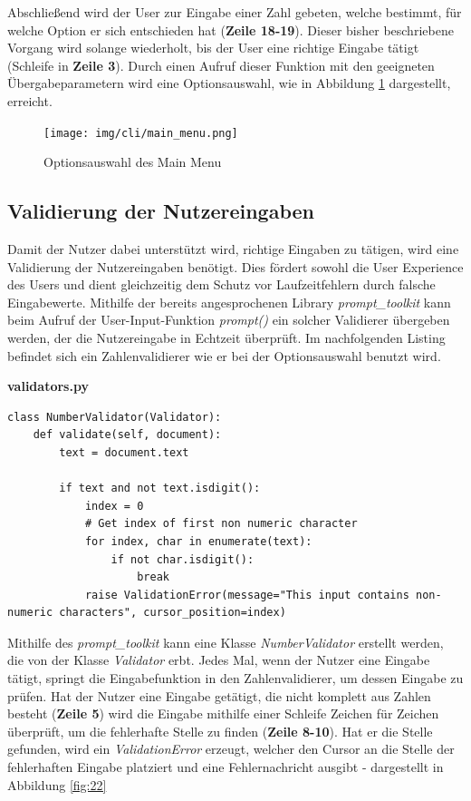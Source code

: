 \documentclass[oneside]{ausarbeitung}
\begin{document}
Abschließend wird der User zur Eingabe einer Zahl gebeten, welche bestimmt, für welche Option er sich entschieden hat (\textbf{Zeile 18-19}). Dieser bisher beschriebene Vorgang wird solange wiederholt, bis der User eine richtige Eingabe tätigt (Schleife in \textbf{Zeile 3}). Durch einen Aufruf dieser Funktion mit den geeigneten Übergabeparametern wird eine Optionsauswahl, wie in Abbildung \ref{fig:21} dargestellt, erreicht. 

\begin{figure}[H]
  \centering
  \texttt{[image: img/cli/main\_menu.png]}
  \caption{Optionsauswahl des Main Menu}
  \label{fig:21}
\end{figure}

\subsection{Validierung der Nutzereingaben}
\label{sub:validierung_der_nutzereingaben}

Damit der Nutzer dabei unterstützt wird, richtige Eingaben zu tätigen, wird eine Validierung der Nutzereingaben benötigt. Dies fördert sowohl die User Experience des Users und dient gleichzeitig dem Schutz vor Laufzeitfehlern durch falsche Eingabewerte. Mithilfe der bereits angesprochenen Library \textit{prompt\_toolkit} kann beim Aufruf der User-Input-Funktion \textit{prompt()} ein solcher Validierer übergeben werden, der die Nutzereingabe in Echtzeit überprüft. Im nachfolgenden Listing befindet sich ein Zahlenvalidierer wie er bei der Optionsauswahl benutzt wird.

\lstset{language=Python}
\lstset{frame=lines}
\lstset{basicstyle=\footnotesize}
\textbf{validators.py}
\begin{lstlisting}
class NumberValidator(Validator):
	def validate(self, document):
		text = document.text

		if text and not text.isdigit():
			index = 0
			# Get index of first non numeric character
			for index, char in enumerate(text):
				if not char.isdigit():
					break
			raise ValidationError(message="This input contains non-numeric characters", cursor_position=index)
\end{lstlisting}

Mithilfe des \textit{prompt\_toolkit} kann eine Klasse \textit{NumberValidator} erstellt werden, die von der Klasse \textit{Validator} erbt. Jedes Mal, wenn der Nutzer eine Eingabe tätigt, springt die Eingabefunktion in den Zahlenvalidierer, um dessen Eingabe zu prüfen. Hat der Nutzer eine Eingabe getätigt, die nicht komplett aus Zahlen besteht (\textbf{Zeile 5}) wird die Eingabe mithilfe einer Schleife Zeichen für Zeichen überprüft, um die fehlerhafte Stelle zu finden (\textbf{Zeile 8-10}). Hat er die Stelle gefunden, wird ein \textit{ValidationError} erzeugt, welcher den Cursor an die Stelle der fehlerhaften Eingabe platziert und eine Fehlernachricht ausgibt - dargestellt in Abbildung \ref{fig:22}
\end{document}
